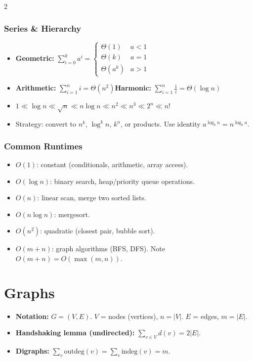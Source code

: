 \documentclass[9pt]{article}
\begin{document}
\begin{multicols}{2}
\subsubsection*{Series \& Hierarchy}

\begin{itemize}
  \item \textbf{Geometric:} $\displaystyle\sum_{i=0}^{k}a^i=\begin{cases}\Theta(1)&a<1\\\Theta(k)&a=1\\\Theta(a^k)&a>1\end{cases}$
  \item \textbf{Arithmetic:} $\sum_{i=1}^{n}i=\Theta(n^2)$\quad\textbf{Harmonic:} $\sum_{i=1}^{n}\tfrac{1}{i}=\Theta(\log n)$
  \item $1\ll\log n\ll\sqrt{n}\ll n\log n\ll n^2\ll n^3\ll 2^n\ll n!$
  \item Strategy: convert to $n^k$, $\log^k n$, $k^n$, or products. Use identity $a^{\log_b n}=n^{\log_b a}$.
\end{itemize}

\subsubsection*{Common Runtimes}

\begin{itemize}
  \item $O(1)$: constant (conditionals, arithmetic, array access).
  \item $O(\log n)$: binary search, heap/priority queue operations.
  \item $O(n)$: linear scan, merge two sorted lists.
  \item $O(n\log n)$: mergesort.
  \item $O(n^2)$: quadratic (closest pair, bubble sort).
  \item $O(m+n)$: graph algorithms (BFS, DFS). Note $O(m+n)=O(\max(m,n))$.
\end{itemize}

\section*{Graphs}

\begin{itemize}
  \item \textbf{Notation:} $G=(V,E)$. $V$ = nodes (vertices), $n=|V|$. $E$ = edges, $m=|E|$.
  \item \textbf{Handshaking lemma (undirected):} $\sum_{v\in V}d(v)=2|E|$.
  \item \textbf{Digraphs:} $\sum_{v}\mathrm{outdeg}(v)=\sum_{v}\mathrm{indeg}(v)=m$.
\end{itemize}


\end{multicols}
\end{document}
